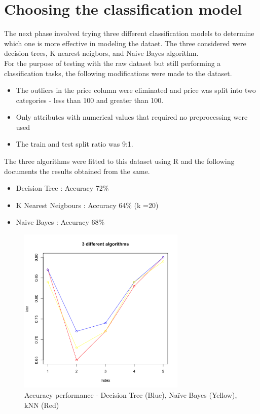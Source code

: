 \documentclass{sig-alternate}
\begin{document}
\section{Choosing the classification model}
The next phase involved trying three different classification models to determine which one is more effective in modeling the dataet. The three considered were decision trees, K nearest neigbors, and Naive Bayes algorithm. \\
For the purpose of testing with the raw dataset but still performing a classification tasks, the following modifications were made to the dataset.\\
\begin{itemize}
	\item The outliers in the price column were eliminated and price was split into two categories - less than 100 and greater than 100.
	\item Only attributes with numerical values that required no preprocessing were used
	\item The train and test split ratio was 9:1.
\end{itemize}
The three algorithms were fitted to this dataset using R and the following documents the results obtained from the same.
\begin{itemize}
	\item Decision Tree : Accuracy 72\%
	\item K Nearest Neigbours : Accuracy 64\% (k =20)
	\item Naive Bayes : Accuracy 68\%
\end{itemize}
\begin{figure}[ht]
		\includegraphics[width=8cm]{line_diagram.jpg}
		\caption{Accuracy performance - Decision Tree (Blue), Naïve Bayes (Yellow), kNN (Red)}
		\label{linediag}
		\centering
	\end{figure}
\end{document}
